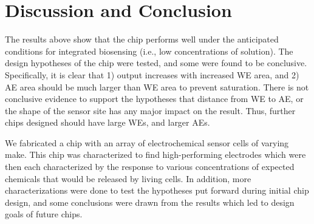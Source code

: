 \chapter{Discussion and Conclusion}

The results above show that the chip performs well under the anticipated conditions for integrated biosensing (i.e., low concentrations of solution). The design hypotheses of the chip were tested, and some were found to be conclusive. Specifically, it is clear that 1) output increases with increased WE area, and 2) AE area should be much larger than WE area to prevent saturation. There is not conclusive evidence to support the hypotheses that distance from WE to AE, or the shape of the sensor site has any major impact on the result. Thus, further chips designed should have large WEs, and larger AEs.

We fabricated a chip with an array of electrochemical sensor cells of varying make. This chip was characterized to find high-performing electrodes which were then each characterized by the response to various concentrations of expected chemicals that would be released by living cells. In addition, more characterizations were done to test the hypotheses put forward during initial chip design, and some conclusions were drawn from the results which led to design goals of future chips.
